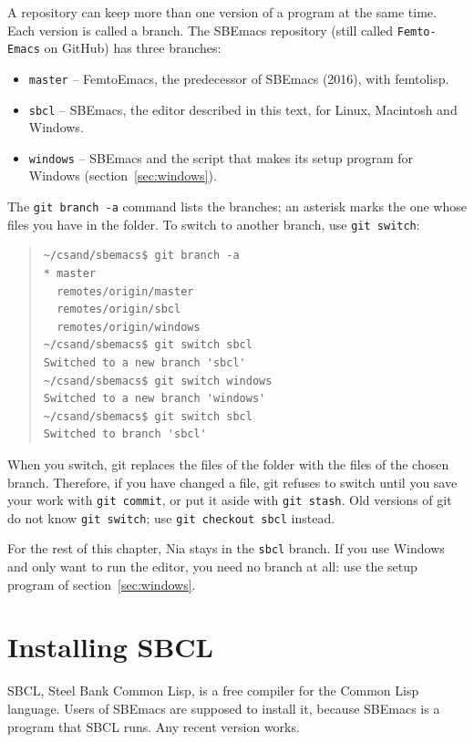 \documentclass[a4paper,12pt,openany]{book}
\begin{document}
A repository can keep more than one version of a program at
the same time. Each version is called a branch. The
SBEmacs repository (still called \verb|Femto-Emacs| on GitHub)
has three branches:
\begin{itemize}
\item \verb|master| -- FemtoEmacs, the predecessor of SBEmacs (2016),
  with femtolisp.
\item \verb|sbcl| -- SBEmacs, the editor described in this text,
  for Linux, Macintosh and Windows.
\item \verb|windows| -- SBEmacs and the script that makes its
  setup program for Windows (section~\ref{sec:windows}).
\end{itemize}
The \verb|git branch -a| command lists the branches; an
asterisk marks the one whose files you have in the folder.
To switch to another branch, use \verb|git switch|:
\begin{quote}
\begin{verbatim}
~/csand/sbemacs$ git branch -a
* master
  remotes/origin/master
  remotes/origin/sbcl
  remotes/origin/windows
~/csand/sbemacs$ git switch sbcl
Switched to a new branch 'sbcl'
~/csand/sbemacs$ git switch windows
Switched to a new branch 'windows'
~/csand/sbemacs$ git switch sbcl
Switched to branch 'sbcl'
\end{verbatim}
\end{quote}
When you switch, git replaces the files of the folder with
the files of the chosen branch. Therefore, if you have changed
a file, git refuses to switch until you save your work
with \verb|git commit|, or put it aside with \verb|git stash|.
Old versions of git do not know \verb|git switch|; use
\verb|git checkout sbcl| instead.

For the rest of this chapter, Nia stays in the \verb|sbcl| branch.
If you use Windows and only want to run the editor, you need no
branch at all: use the setup program of section~\ref{sec:windows}.

\section{Installing SBCL}

SBCL, Steel Bank Common Lisp, is a free compiler for the Common Lisp
language. Users of SBEmacs are supposed to install it, because
SBEmacs is a program that SBCL runs. Any recent version works.
\end{document}
